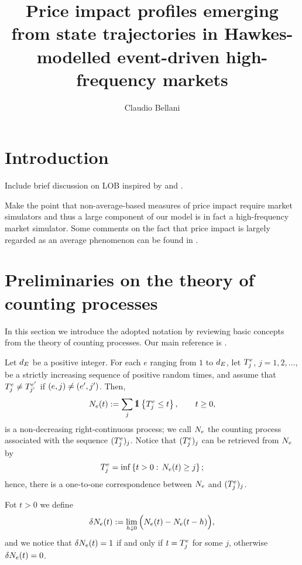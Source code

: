 \documentclass[10pt]{article}
\title{Price impact profiles emerging from state trajectories in Hawkes-modelled event-driven high-frequency markets}
\author{Claudio Bellani}
\begin{document}
 
\maketitle
\tableofcontents

\section{Introduction}
Include brief discussion on LOB inspired by \citealp[Chapter 6]{FPR13mar} and \citealp{GPWMFH13lim}.

Make the point that non-average-based measures of  price impact require market simulators and thus a large component of our model is in fact a high-frequency market simulator. Some comments on the fact that price impact is largely regarded as an average phenomenon can be found in \citealp{BMBB19imp}. 

\section{Preliminaries on the theory of counting processes} 
In this section we introduce the adopted notation by reviewing basic concepts from the theory of counting processes. Our main reference is \citealp[Chapter 14]{DVJ08int}.

Let $\numEventTypes$ be a positive integer. For each $e$ ranging from $1$ to $\numEventTypes$, let $\arrivalTimes_{j}$, $j=1, 2, \dots$, be a strictly increasing sequence of positive random times, and assume that $\arrivalTimes_{j}\neq\arrivalTimes[e\derivative]_{j\derivative}$ if $(e,j)\neq (e\derivative,j\derivative)$. Then, 
\begin{equation*}
 \countingProc(t):= \sum_{j} \one\left\lbrace\arrivalTimes_{j}\leq t \right\rbrace, \qquad t\geq 0,
\end{equation*}
is a non-decreasing right-continuous process; we call $\countingProc$ the counting process associated with the sequence $(\arrivalTimes_{j})_j$. Notice that $(\arrivalTimes_{j})_j$ can be retrieved from $\countingProc$ by 
\begin{equation*}
 \arrivalTimes_{j} = \inf \left\lbrace t>0: \, \countingProc(t)\geq j\right\rbrace;
\end{equation*}
hence, there is a one-to-one correspondence between $\countingProc$ and $(\arrivalTimes_{j})_j$. 

Fot $t>0$ we define 
\begin{equation*}
 \delta\countingProc(t):= \lim_{h\downarrow 0} \Big( \countingProc(t) - \countingProc(t-h) \Big),
\end{equation*}
and we notice that $\delta \countingProc(t) = 1$ if and only if $t=\arrivalTimes_{j}$ for some $j$, otherwise $\delta \countingProc(t) = 0$.
\end{document}
